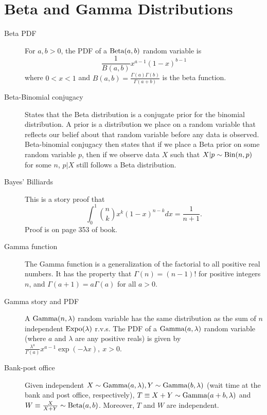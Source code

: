 \documentclass{article}
\begin{document}
 

\header

\section{Beta and Gamma Distributions}

\begin{description}
    \item[Beta PDF] For $a, b > 0$, the PDF of a $\textrm{Beta}(a, b)$ random variable is $$\frac{1}{B(a, b)}x^{a - 1}(1 - x)^{b - 1}$$
    where $0 < x < 1$ and $B(a, b) = \frac{\Gamma(a)\Gamma(b)}{\Gamma(a + b)}$ is the beta function.
    
    \item[Beta-Binomial conjugacy] States that the Beta distribution is a conjugate prior for the binomial distribution. A prior is a distribution we place on a random variable that reflects our belief about that random variable before any data is observed. Beta-binomial conjugacy then states that if we place a Beta prior on some random variable $p$, then if we observe data $X$ such that $X|p \sim \textrm{Bin}(n,p)$ for some $n$, $p|X$ still follows a Beta distribution. 
    
    \item [Bayes' Billiards] This is a story proof that 
    $$\int_0^1\binom{n}{k}x^k(1 - x)^{n - k}dx = \frac{1}{n + 1}.$$
    Proof is on page 353 of book.
    
    \item[Gamma function] The Gamma function is a generalization of the factorial to all positive real numbers. It has the property that $\Gamma(n) = (n-1)!$ for positive integers $n$, and $\Gamma(a+1)=a\Gamma(a)$ for all $a > 0$. 
    
    \item[Gamma story and PDF] A $\textrm{Gamma}(n, \lambda)$ random variable has the same distribution as the sum of $n$ independent $\textrm{Expo}(\lambda)$ r.v.s. The PDF of a $\textrm{Gamma}(a,\lambda)$ random variable (where $a$ and $\lambda$ are any positive reals) is given by 
    $\frac{\lambda^a}{\Gamma(a)} x^{a-1}\exp(-\lambda x), \  x> 0$.
    
    \item[Bank-post office] Given independent $X \sim \textrm{Gamma}(a, \lambda), Y \sim \textrm{Gamma}(b, \lambda)$ (wait time at the bank and post office, respectively), $T \equiv X + Y \sim \textrm{Gamma}(a + b, \lambda)$ and $W \equiv \frac{X}{X + Y} \sim \textrm{Beta}(a, b)$. Moreover, $T$ and $W$ are independent.
\end{description}
\end{document}
